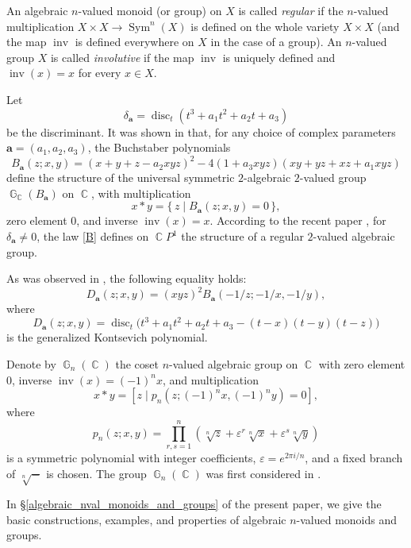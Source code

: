 \documentclass[14pt, dvipsnames]{extarticle}
\theoremstyle{plain}
\theoremstyle{definition}
\theoremstyle{remark}
\DeclareMathOperator{\disc}{\mathrm{disc}}
\DeclareMathOperator{\G}{\mathbb{G}}
\DeclareMathOperator{\Sym}{\mathrm{Sym}}
\DeclareMathOperator{\inv}{\mathrm{inv}}
\DeclareMathOperator{\Cc}{\mathbb{C}}
\begin{document}
An algebraic $n$-valued monoid (or group) on $X$ is called {\it regular} if the $n$-valued multiplication $X\times X\to \Sym^n(X)$ is defined on the whole variety $X\times X$ (and the map $\inv$ is defined everywhere on $X$ in the case of a group). An $n$-valued group $X$ is called {\it involutive} if the map $\inv$ is uniquely defined and $\inv(x) = x$ for every $x\in X$. 

Let
$$\delta_{\boldsymbol{a}} = \disc_t(t^3 + a_1t^2 + a_2t + a_3)$$
be the discriminant. It was shown in \cite[Theorem 6.3]{Buchstaber_Veselov19} that, for any choice of complex parameters $\boldsymbol{a} = (a_1, a_2, a_3)$, the Buchstaber polynomials
\begin{equation}\label{B}
B_{\boldsymbol{a}}(z; x, y) = (x + y + z - a_2xyz)^2 - 4(1 + a_3xyz)(xy + yz + xz + a_1xyz)
\end{equation}
define the structure of the universal symmetric $2$-algebraic $2$-valued group $\G_{\Cc}(B_{\boldsymbol{a}})$ on $\Cc$, with multiplication
$$x\ast y = \{\,z\mid B_{\boldsymbol{a}}(z; x, y)= 0\,\},$$
zero element $0$, and inverse $\inv(x) = x$. According to the recent paper \cite[Theorem 4.7]{Kontsevich_type_polynomials}, for $\delta_{\boldsymbol{a}}\neq 0$, the law \eqref{B} defines on $\Cc\!P^1$ the structure of a regular $2$-valued algebraic group.   

As was observed in \cite[Theorem 4.7]{Kontsevich_type_polynomials}, the following equality holds:
$$D_{\boldsymbol{a}}(z; x, y) = (xyz)^2B_{\boldsymbol{a}}(-1/z; -1/x, -1/y),$$
where
$$D_{\boldsymbol{a}}(z; x, y) = \disc_t\bigl(t^3 + a_1 t^2 + a_2 t + a_3 - (t - x)(t - y)(t - z)\bigr)$$
is the generalized Kontsevich polynomial. 

Denote by $\G_n(\Cc)$ the coset \cite[Theorem 1]{Buchstaber} $n$-valued algebraic group on $\Cc$ with zero element $0$, inverse $\inv(x) = (-1)^nx$, and multiplication
$$x\ast y = [z\mid p_n(z; (-1)^nx, (-1)^ny) = 0],$$
where
\begin{equation}\label{polynomial_p_n_intro}
p_n(z; x, y) = \prod\limits_{r, s = 1}^{n}(\sqrt[n]{z} + \varepsilon^r\sqrt[n]{x} + \varepsilon^s\sqrt[n]{y})
\end{equation}
is a symmetric polynomial with integer coefficients, $\varepsilon = e^{2\pi i/n}$, and a fixed branch of $\sqrt[n]{-}$ is chosen. The group $\G_n(\Cc)$ was first considered in \cite{Buchstaber_Novikov}. 

In \S\ref{algebraic_nval_monoids_and_groups} of the present paper, we give the basic constructions, examples, and properties of algebraic $n$-valued monoids and groups.
\end{document}
